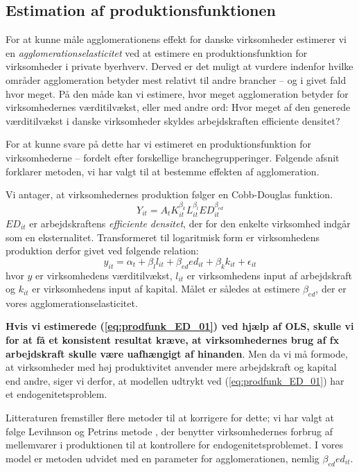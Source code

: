 \subsection{Estimation af produktionsfunktionen}
For at kunne måle agglomerationens effekt for danske virksomheder estimerer vi en \emph{agglomerationselasticitet} ved at estimere en produktionsfunktion for virksomheder i private byerhverv. Derved er det muligt at vurdere indenfor hvilke områder agglomeration betyder mest relativt til andre brancher -- og i givet fald hvor meget. På den måde kan vi estimere, hvor meget agglomeration betyder for virksomhedernes værditilvækst, eller med andre ord: Hvor meget af den generede værditilvækst i danske virksomheder skyldes arbejdskraften efficiente densitet?

For at kunne svare på dette har vi estimeret en produktionsfunktion for virksomhederne -- fordelt efter forskellige branchegrupperinger. Følgende afsnit forklarer metoden, vi har valgt til at bestemme effekten af agglomeration.

Vi antager, at virksomhedernes produktion følger en Cobb-Douglas funktion. 
\begin{equation}
	Y_{it} = A_t K_{it}^{\beta_k} L_{it}^{\beta_l} 
	ED_{it}^{\beta_{ed}}  
\end{equation}
$ED_{it}$ er arbejdskraftens \emph{efficiente densitet}, der for den enkelte virksomhed indgår som en eksternalitet.
Transformeret til logaritmisk form er virksomhedens produktion derfor givet ved følgende relation:
\begin{equation}
	y_{it} = \alpha_t + \beta_l l_{it} + \beta_{ed} ed_{it} + \beta_{k} k_{it} + \epsilon_{it}
	\label{eq:prodfunk_ED_01}
\end{equation}
hvor $y$ er virksomhedens værditilvækst, $l_{it}$ er virksomhedens input af arbejdskraft og $k_{it}$ er virksomhedens input af kapital. Målet er således at estimere $\beta_{ed}$, der er vores agglomerationselasticitet.

\textbf{Hvis vi estimerede (\ref{eq:prodfunk_ED_01}) ved hjælp af OLS, skulle vi for at få et konsistent resultat kræve, at virksomhedernes brug af fx arbejdskraft skulle være uafhængigt af hinanden}. Men da vi må formode, at virksomheder med høj produktivitet anvender mere arbejdskraft og kapital end andre, siger vi derfor, at modellen udtrykt ved (\ref{eq:prodfunk_ED_01}) har et endogenitetsproblem.

Litteraturen fremstiller flere metoder til at korrigere for dette; vi har valgt at følge Levihnson og Petrins metode \cite{levinsohn2003estimating}, der benytter virksomhedernes forbrug af mellemvarer i produktionen til at kontrollere for endogenitetsproblemet. I vores model er metoden udvidet med en parameter for agglomerationen, nemlig $\beta_{ed} ed_{it}$.

